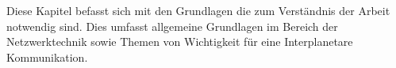 Diese Kapitel befasst sich mit den Grundlagen die zum Verst{\"a}ndnis der Arbeit
notwendig sind. Dies umfasst allgemeine Grundlagen im Bereich der
Netzwerktechnik sowie Themen von Wichtigkeit f{\"u}r eine Interplanetare Kommunikation.
